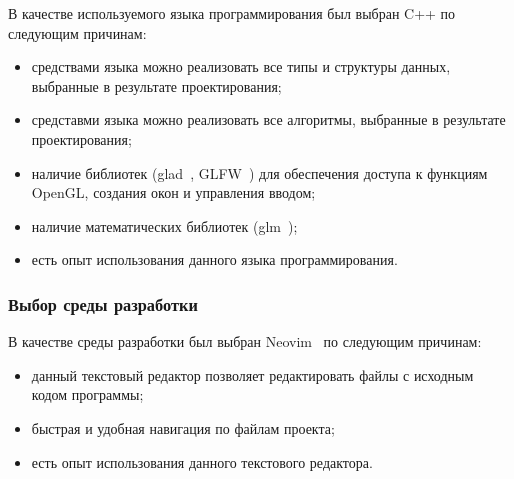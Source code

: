 В качестве используемого языка программирования был выбран C++ по следующим причинам:
\begin{itemize}
    \item средствами языка можно реализовать все типы и структуры данных, выбранные в результате проектирования;
    \item средставми языка можно реализовать все алгоритмы, выбранные в результате проектирования;
    \item наличие библиотек (glad~\cite{glad}, GLFW~\cite{glfw}) для обеспечения доступа к функциям OpenGL, создания окон и управления вводом;
    \item наличие математических библиотек (glm~\cite{glm});
    \item есть опыт использования данного языка программирования.
\end{itemize}

\subsubsection{Выбор среды разработки}

В качестве среды разработки был выбран Neovim~\cite{nvim} по следующим причинам:
\begin{itemize}
    \item данный текстовый редактор позволяет редактировать файлы с исходным кодом программы;
    \item быстрая и удобная навигация по файлам проекта;
    \item есть опыт использования данного текстового редактора.
\end{itemize}

